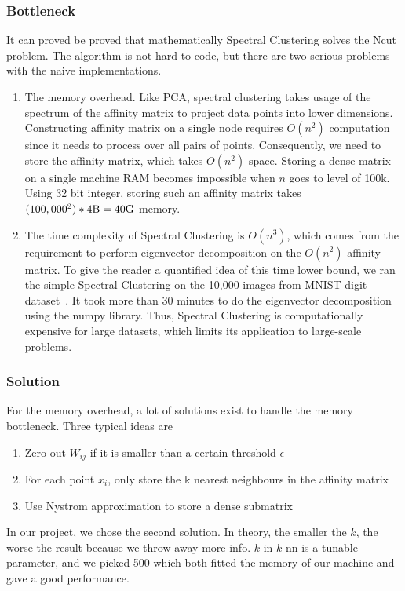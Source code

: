 \documentclass{acm_proc_article-sp}
\begin{document}
\subsubsection{Bottleneck}
It can proved be proved that mathematically Spectral Clustering solves the Ncut problem. The algorithm is not hard to code, but there are two serious problems with the naive implementations.
\begin{enumerate}
\item{The memory overhead. Like PCA, spectral clustering takes usage of the spectrum of the affinity matrix to project data points into lower dimensions. Constructing affinity matrix on a single node requires $O(n^2)$ computation since it needs to process over all pairs of points. Consequently, we need to store the affinity matrix, which takes $O(n^2)$ space. Storing a dense matrix on a single machine RAM becomes impossible when $n$ goes to level of 100k. Using 32 bit integer, storing such an affinity matrix takes $(100,000^2) * 4 \textnormal{B} = 40 \textnormal{G}$ memory.
}
\item{The time complexity of Spectral Clustering is $O(n^3)$, which comes from the requirement to perform eigenvector decomposition on the $O(n^2)$ affinity matrix. To give the reader a quantified idea of this time lower bound, we ran the simple Spectral Clustering on the 10,000 images from MNIST digit dataset~\cite{Lichman:2013}. It took more than 30 minutes to do the eigenvector decomposition using the numpy library. Thus, Spectral Clustering is computationally expensive for large datasets, which limits its application to large-scale problems.}
\end{enumerate}

\subsubsection{Solution}
For the memory overhead, a lot of solutions exist to handle the memory bottleneck. Three typical ideas are
\begin{enumerate}
\item{Zero out $W_{ij}$ if it is smaller than a certain threshold $\epsilon$}
\item{For each point $x_i$, only store the k nearest neighbours in the affinity matrix}
\item{Use Nystrom approximation to store a dense submatrix~\cite{fowlkes2004spectral}}
\end{enumerate}
In our project, we chose the second solution. In theory, the smaller the $k$, the worse the result because we throw away more info. $k$ in $k$-nn is a tunable parameter, and we picked 500 which both fitted the memory of our machine and gave a good performance. 
\end{document}
